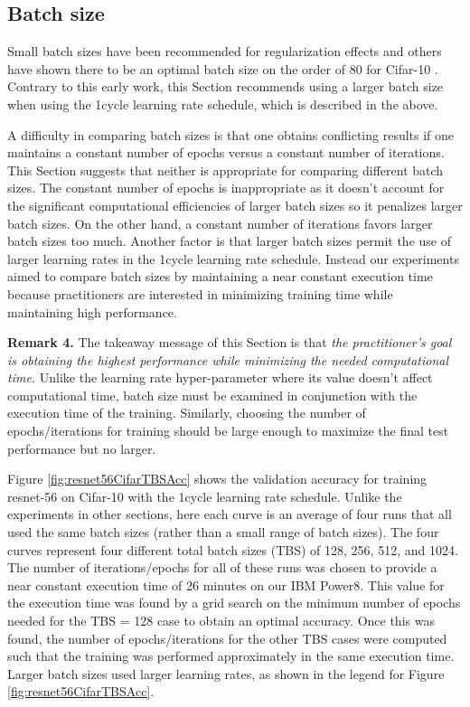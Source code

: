 \documentclass{article} %
\begin{document}
\subsection{Batch size}
\label{sec:TBS}

Small batch sizes have been recommended for regularization effects \citep{wilson2003general} and others have shown there to be an optimal batch size on the order of 80 for Cifar-10 \citep{smith2017understanding}. Contrary to this early work, this Section recommends using a larger batch size when using the 1cycle learning rate schedule, which is described in the above.

A difficulty in comparing batch sizes is that one obtains conflicting results if one maintains a constant number of epochs versus a constant number of iterations.  This Section suggests that neither is appropriate for comparing different batch sizes.  The constant number of epochs is inappropriate as it doesn't account for the significant computational efficiencies of larger batch sizes so it penalizes larger batch sizes.  On the other hand, a constant number of iterations favors larger batch sizes too much.  Another factor is that larger batch sizes permit the use of larger learning rates in the 1cycle learning rate schedule.   Instead our experiments aimed to compare batch sizes by maintaining a near constant execution time because practitioners are interested in minimizing training time while maintaining high performance.  

\textbf{Remark 4.}
The takeaway message of this Section is that \emph{the practitioner's goal is obtaining the highest performance while minimizing the needed computational time.}  Unlike the learning rate hyper-parameter where its value doesn't affect computational time, batch size must be examined in conjunction with the execution time of the training.  Similarly, choosing the number of epochs/iterations for training should be large enough to maximize the final test performance but no larger.

Figure \ref{fig:resnet56CifarTBSAcc} shows the validation accuracy for training resnet-56 on Cifar-10 with the 1cycle learning rate schedule. Unlike the experiments in other sections, here each curve is an average of four runs that all used the same batch sizes (rather than a small range of batch sizes).  The four curves represent four different total batch sizes (TBS) of 128, 256, 512, and 1024.  The number of iterations/epochs for all of these runs was chosen to provide a near constant execution time of 26 minutes on our IBM Power8.  This value for the execution time was found by a grid search on the minimum number of epochs needed for the TBS = 128 case to obtain an optimal accuracy.  Once this was found, the number of epochs/iterations for the other TBS cases were computed such that the training was performed approximately in the same execution time.  Larger batch sizes used larger learning rates, as shown in the legend for Figure \ref{fig:resnet56CifarTBSAcc}.
\end{document}
